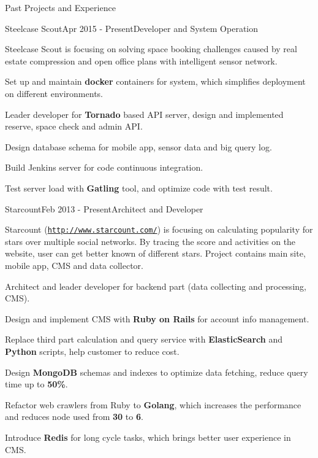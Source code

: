 \documentclass{resume} %
\newcommand{\http}{http:/\hspace{-0.3ex}/}
\begin{document}
\begin{rSection}{Past Projects and Experience}


\begin{rSubsection}{Steelcase Scout}{Apr 2015 - Present}{Developer and System Operation}{}

Steelcase Scout is focusing on solving space booking challenges caused by real estate compression and open office plans with intelligent sensor network.

\begin{rSubsectionList}
\item Set up and maintain \textbf{docker} containers for system, which simplifies deployment on different environments.
\item Leader developer for \textbf{Tornado} based API server, design and implemented reserve, space check and admin API.
\item Design database schema for mobile app, sensor data and big query log.
\item Build Jenkins server for code continuous integration.
\item Test server load with \textbf{Gatling} tool, and optimize code with test result.
\end{rSubsectionList}
\end{rSubsection}

\begin{rSubsection}{Starcount}{Feb 2013 - Present}{Architect and Developer}{}

Starcount (\href{http://www.starcount.com/}{\tt \http{}www.starcount.com/}) is focusing on calculating popularity for stars over multiple social networks. By tracing the score and activities on the website, user can get better known of different stars. Project contains main site, mobile app, CMS and data collector.

\begin{rSubsectionList}
\item Architect and leader developer for backend part (data collecting and processing, CMS).
\item Design and implement CMS with \textbf{Ruby on Rails} for account info management.
\item Replace third part calculation and query service with \textbf{ElasticSearch} and \textbf{Python} scripts, help customer to reduce cost.
\item Design \textbf{MongoDB} schemas and indexes to optimize data fetching, reduce query time up to \textbf{50\%}.
\item Refactor web crawlers from Ruby to \textbf{Golang}, which increases the performance and reduces node used from \textbf{30} to \textbf{6}.
\item Introduce \textbf{Redis} for long cycle tasks, which brings better user experience in CMS.
\end{rSubsectionList}
\end{rSubsection}




\end{rSection}
\end{document}
